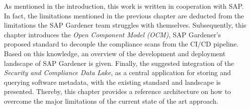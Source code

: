 As mentioned in the introduction, this work is written in cooperation with SAP. In fact, the limitations mentioned in the previous chapter are deducted from the limitations the SAP Gardener team struggles with themselves. Subsequently, this chapter introduces the \textit{Open Component Model (OCM)}, SAP Gardener's proposed standard to decouple the compliance scans from the CI/CD pipeline. Based on this knowledge, an overview of the development and deployment landscape of SAP Gardener is given. Finally, the suggested integration of the \emph{Security and Compliance Data Lake}, as a central application for storing and querying software metadata, with the existing standard and landscape is presented. Thereby, this chapter provides a reference architecture on how to overcome the major limitations of the current state of the art approach.

